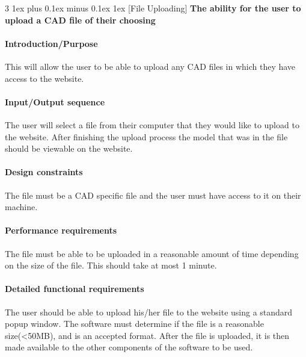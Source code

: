 \documentclass[letterpaper, 10pt, draftclsnofoot, compsoc, onecolumn]{IEEEtran}
\makeatletter
\def\subsubsection{\@startsection{subsubsection}%
                                 {3}%
                                 {\z@}%
                                 {1ex plus 0.1ex minus 0.1ex}%
                                 {1ex}%
                                 {\normalfont\normalsize}}%
\makeatother
\begin{document}
\subsubsection[{File Uploading}]{\rmfamily\bfseries\color{black}
	The ability for the user to upload a CAD file of their choosing
}
\smallskip

\paragraph[Introduction/Purpose of this feature]
{\rmfamily\bfseries\color{black} Introduction/Purpose }
	This will allow the user to be able to upload any CAD files in which they have access to the website.

\paragraph[Input/Output sequence:]{\rmfamily\bfseries\color{black}
Input/Output sequence }
	The user will select a file from their computer that they would like to upload to the website. After finishing the upload process 
	the model that was in the file should be viewable on the website. 

\paragraph[Design constraints of this
feature]{\rmfamily\bfseries\color{black} Design
constraints }
	The file must be a CAD specific file and the user must have access to it on their machine. 

\paragraph[Performance requirements of this
feature]{\rmfamily\bfseries\color{black}
Performance requirements }
	The file must be able to be uploaded in a reasonable amount of time depending on the size of the file. This should take at 
	most 1 minute. 


\paragraph[Detailed functional requirements of this
feature]{\rmfamily\bfseries\color{black}
Detailed functional requirements }
	The user should be able to upload his/her file to the website using a standard popup window. The software must determine if 
	the file is a reasonable size(<50MB), and is an accepted format. After the file is uploaded, it is then made available to the 
	other components of the software to be used.
\end{document}
